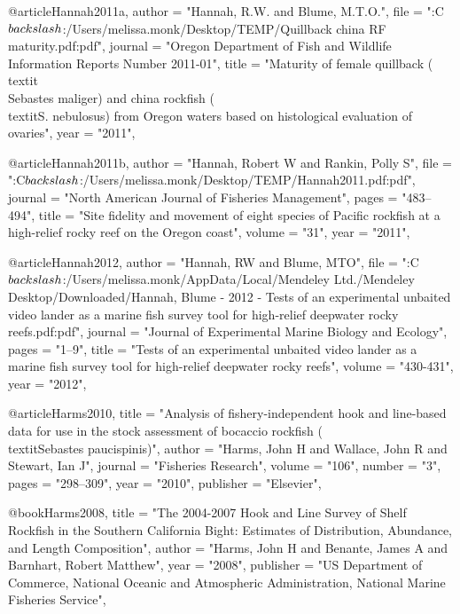 @article{Hannah2011a,
    author = "{Hannah, R.W. and Blume, M.T.O.}",
    file = "{:C$\\backslash$:/Users/melissa.monk/Desktop/TEMP/Quillback china RF maturity.pdf:pdf}",
    journal = "{Oregon Department of Fish and Wildlife Information Reports Number 2011-01}",
    title = "{{Maturity of female quillback (\\textit\\{{Sebastes} maliger}) and china rockfish (\\textit{S. nebulosus}) from Oregon waters based on histological evaluation of ovaries}}",
    year = "{2011}",
}

@article{Hannah2011b,
    author = "{Hannah, Robert W and Rankin, Polly S}",
    file = "{:C$\\backslash$:/Users/melissa.monk/Desktop/TEMP/Hannah2011.pdf:pdf}",
    journal = "{North American Journal of Fisheries Management}",
    pages = "{483--494}",
    title = "{{Site fidelity and movement of eight species of Pacific rockfish at a high-relief rocky reef on the Oregon coast}}",
    volume = "{31}",
    year = "{2011}",
}

@article{Hannah2012,
    author = "{Hannah, RW and Blume, MTO}",
    file = "{:C$\\backslash$:/Users/melissa.monk/AppData/Local/Mendeley Ltd./Mendeley Desktop/Downloaded/Hannah, Blume - 2012 - Tests of an experimental unbaited video lander as a marine fish survey tool for high-relief deepwater rocky reefs.pdf:pdf}",
    journal = "{Journal of Experimental Marine Biology and Ecology}",
    pages = "{1--9}",
    title = "{{Tests of an experimental unbaited video lander as a marine fish survey tool for high-relief deepwater rocky reefs}}",
    volume = "{430-431}",
    year = "{2012}",
}

@article{Harms2010,
    title = "{Analysis of fishery-independent hook and line-based data for use in the stock assessment of bocaccio rockfish (\\textit{{{Sebastes}} paucispinis})}",
    author = "{Harms, John H and Wallace, John R and Stewart, Ian J}",
    journal = "{Fisheries Research}",
    volume = "{106}",
    number = "{3}",
    pages = "{298--309}",
    year = "{2010}",
    publisher = "{Elsevier}",
}

@book{Harms2008,
    title = "{The 2004-2007 Hook and Line Survey of Shelf Rockfish in the Southern California Bight: Estimates of Distribution, Abundance, and Length Composition}",
    author = "{Harms, John H and Benante, James A and Barnhart, Robert Matthew}",
    year = "{2008}",
    publisher = "{US Department of Commerce, National Oceanic and Atmospheric Administration, National Marine Fisheries Service}",
}

